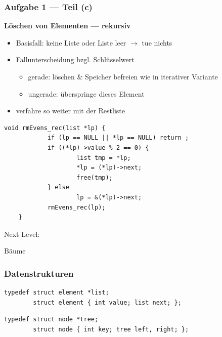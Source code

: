 \documentclass{beamer}
\newcommand*{\ttfamilywithbold}{\fontfamily{lmtt}\selectfont}
\begin{document}
\begin{frame}[fragile] \frametitle{Aufgabe 1 --- Teil (c)}
	\textbf{Löschen von Elementen --- rekursiv} \small
	\begin{itemize}
		\item Basisfall: keine Liste oder Liste leer $\to$ tue nichts
		\item Fallunterscheidung bzgl. Schlüsselwert
		\begin{itemize} \footnotesize
			\item gerade: löschen \& Speicher befreien wie in iterativer Variante
			\item ungerade: überspringe dieses Element
		\end{itemize}
		\item verfahre so weiter mit der Restliste
	\end{itemize}
	
	\pause
	
	\begin{lstlisting}[style=notebook, basicstyle=\scriptsize\ttfamilywithbold]
	void rmEvens_rec(list *lp) { 
			if (lp == NULL || *lp == NULL) return ;
			if ((*lp)->value % 2 == 0) {
					list tmp = *lp;
					*lp = (*lp)->next;
					free(tmp);
			} else
					lp = &(*lp)->next;
			rmEvens_rec(lp);  
	}
	\end{lstlisting}
\end{frame}



\begin{frame}
	\bfseries \centering \Huge
	
	Next Level: 
	
	Bäume
\end{frame}





\begin{frame}[fragile, t] \frametitle{Datenstrukturen}
	\begin{lstlisting}[style=notebook]
		typedef struct element *list;
		struct element { int value; list next; };
	\end{lstlisting}
	\pause
	\begin{lstlisting}[style=notebook]
		typedef struct node *tree;
		struct node { int key; tree left, right; };
		
	\end{lstlisting}
\end{frame}
\end{document}
